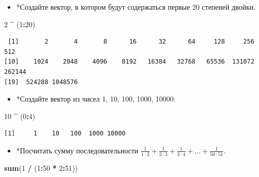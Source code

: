\documentclass[
]{book}
\newenvironment{Shaded}{\begin{snugshade}}{\end{snugshade}}
\newcommand{\DecValTok}[1]{\textcolor[rgb]{0.00,0.00,0.81}{#1}}
\newcommand{\KeywordTok}[1]{\textcolor[rgb]{0.13,0.29,0.53}{\textbf{#1}}}
\newcommand{\NormalTok}[1]{#1}
\newcommand{\OperatorTok}[1]{\textcolor[rgb]{0.81,0.36,0.00}{\textbf{#1}}}
\newcommand{\StringTok}[1]{\textcolor[rgb]{0.31,0.60,0.02}{#1}}
\providecommand{\tightlist}{%
  \setlength{\itemsep}{0pt}\setlength{\parskip}{0pt}}
\begin{document}
\begin{itemize}
\tightlist
\item
  *Создайте вектор, в котором будут содержаться первые 20 степеней двойки.
\end{itemize}

\begin{Shaded}
\begin{Highlighting}[]
\DecValTok{2} \OperatorTok{^}\StringTok{ }\NormalTok{(}\DecValTok{1}\OperatorTok{:}\DecValTok{20}\NormalTok{)}
\end{Highlighting}
\end{Shaded}

\begin{verbatim}
 [1]       2       4       8      16      32      64     128     256     512
[10]    1024    2048    4096    8192   16384   32768   65536  131072  262144
[19]  524288 1048576
\end{verbatim}

\begin{itemize}
\tightlist
\item
  *Создайте вектор из чисел 1, 10, 100, 1000, 10000:
\end{itemize}

\begin{Shaded}
\begin{Highlighting}[]
\DecValTok{10} \OperatorTok{^}\StringTok{ }\NormalTok{(}\DecValTok{0}\OperatorTok{:}\DecValTok{4}\NormalTok{)}
\end{Highlighting}
\end{Shaded}

\begin{verbatim}
[1]     1    10   100  1000 10000
\end{verbatim}

\begin{itemize}
\tightlist
\item
  *Посчитать сумму последовательности \(\frac{1}{1 \cdot 2}+\frac{1}{2 \cdot 3}+\frac{1}{3 \cdot 4}+\ldots+\frac{1}{50 \cdot 51}\).
\end{itemize}

\begin{Shaded}
\begin{Highlighting}[]
\KeywordTok{sum}\NormalTok{(}\DecValTok{1} \OperatorTok{/}\StringTok{ }\NormalTok{(}\DecValTok{1}\OperatorTok{:}\DecValTok{50} \OperatorTok{*}\StringTok{ }\DecValTok{2}\OperatorTok{:}\DecValTok{51}\NormalTok{))}
\end{Highlighting}
\end{Shaded}
\end{document}

